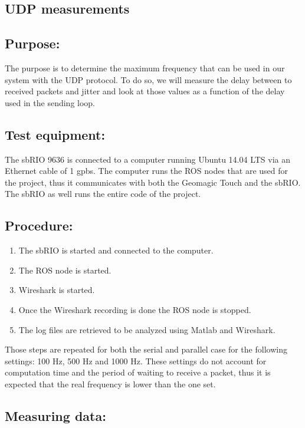 \subsection{UDP measurements}\label{sec_udp_mes}

\subsection*{Purpose:}

The purpose is to determine the maximum frequency that can be used in our system with the UDP protocol. To do so, we will measure the delay between to received packets and jitter and look at those values as a function of the delay used in the sending loop.

\subsection*{Test equipment:}

The sbRIO 9636 is connected to a computer running Ubuntu 14.04 LTS via an Ethernet cable of 1 gpbs. The computer runs the ROS nodes that are used for the project, thus it communicates with both the Geomagic Touch and the sbRIO. The sbRIO as well runs the entire code of the project.

\subsection*{Procedure:}

\begin{enumerate}
	\item The sbRIO is started and connected to the computer.
	\item The ROS node is started.
	\item Wireshark is started.%
	\item Once the Wireshark recording is done the ROS node is stopped.
	\item The log files are retrieved to be analyzed using Matlab and Wireshark.
\end{enumerate}
Those steps are repeated for both the serial and parallel case for the following settings: 100 Hz, 500 Hz and 1000 Hz. These settings do not account for computation time and the period of waiting to receive a packet, thus it is expected that the real frequency is lower than the one set.


\subsection*{Measuring data:}


